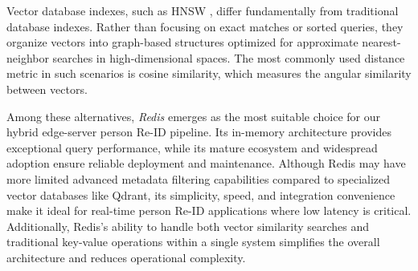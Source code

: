 \documentclass[../main.tex]{subfiles}
\begin{document}
Vector database indexes, such as HNSW \cite{hnsw}, differ fundamentally from traditional database indexes. Rather than focusing on exact matches or sorted queries, they organize vectors into graph-based structures optimized for approximate nearest-neighbor searches in high-dimensional spaces. The most commonly used distance metric in such scenarios is cosine similarity, which measures the angular similarity between vectors.

Among these alternatives, \textit{Redis} emerges as the most suitable choice for our hybrid edge-server person Re-ID pipeline. Its in-memory architecture provides exceptional query performance, while its mature ecosystem and widespread adoption ensure reliable deployment and maintenance. Although Redis may have more limited advanced metadata filtering capabilities compared to specialized vector databases like Qdrant, its simplicity, speed, and integration convenience make it ideal for real-time person Re-ID applications where low latency is critical. Additionally, Redis's ability to handle both vector similarity searches and traditional key-value operations within a single system simplifies the overall architecture and reduces operational complexity.
\end{document}

